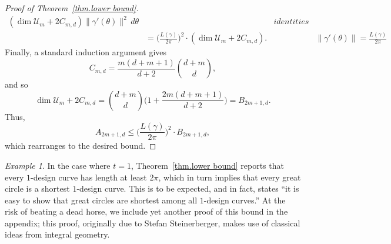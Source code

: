 \documentclass[12pt]{article}
\theoremstyle{plain}
\theoremstyle{definition}
\theoremstyle{remark}
\newtheorem{ex}[thm]{Example}
\begin{document}
\begin{proof}[Proof of Theorem~\ref{thm.lower bound}]
\[\begin{aligned}
(\operatorname{dim}\mathcal{U}_m+2C_{m,d})\|\gamma'(\theta)\|^2\,d\theta&&\textit{identities above}\\
&=
\bigg(\frac{L(\gamma)}{2\pi}\bigg)^2\cdot
(\operatorname{dim}\mathcal{U}_m+2C_{m,d}).
&&\textit{\(\|\gamma'(\theta)\|=\frac{L(\gamma)}{2\pi}\)}
\end{aligned}
\]
Finally, a standard induction argument gives
\[
C_{m,d}
=
\frac{m(d+m+1)}{d+2}\binom{d+m}{d},
\]
and so
\[
\operatorname{dim}\mathcal{U}_m+2C_{m,d}
=
\binom{d+m}{d}
\bigg(
1+\frac{2m(d+m+1)}{d+2}
\bigg)
=
B_{2m+1,d}.
\]
Thus,
\[
A_{2m+1,d}
\leq
\bigg(\frac{L(\gamma)}{2\pi}\bigg)^2\cdot B_{2m+1,d},
\]
which rearranges to the desired bound.
\end{proof}


\begin{ex}
\label{ex.great circle}
In the case where $t=1$, Theorem~\ref{thm.lower bound} reports that every $1$-design curve has length at least $2\pi$, which in turn implies that every great circle is a shortest $1$-design curve.
This is to be expected, and in fact, \cite{EhlerGK:25} states ``it is easy to show that great circles are shortest among all $1$-design curves.''
At the risk of beating a dead horse, we include yet another proof of this bound in the appendix; this proof, originally due to Stefan Steinerberger, makes use of classical ideas from integral geometry.
\end{ex}
\end{document}
